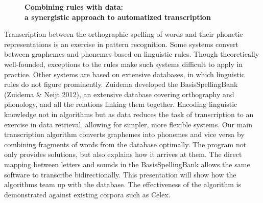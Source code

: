 \documentclass[10pt, a4paper, twopage, headinclude, footinclude, BCOR5mm]{book}
\begin{document}
\begin{figure}[t!]
\centering
\large\textbf{Combining rules with data: \\ a synergistic approach to automatized transcription}
\vspace*{0.5cm}
\end{figure}


\begin{table}[t!]
\end{table} 
\begin{table}[t!]
\end{table} 
\noindent
Transcription between the orthographic spelling of words and their phonetic representations is an exercise in pattern recognition. Some systems convert between graphemes and phonemes based on linguistic rules. Though theoretically well-founded, exceptions to the rules make such systems difficult to apply in practice. Other systems are based on extensive databases, in which linguistic rules do not figure prominently.  Zuidema developed the BasisSpellingBank (Zuidema \& Neijt 2012), an extensive database covering orthography and phonology, and all the relations linking them together. Encoding linguistic knowledge not in algorithms but as data reduces the task of transcription to an exercise in data retrieval, allowing for simpler, more flexible systems.  Our main transcription algorithm converts graphemes into phonemes and vice versa by combining fragments of words from the database optimally. The program not only provides solutions, but also explains how it arrives at them. The direct mapping between letters and sounds in the BasisSpellingBank allows the same software to transcribe bidirectionally.  This presentation will show how the algorithms team up with the database. The effectiveness of the algorithm is demonstrated against existing corpora such as Celex.   
\end{document}

